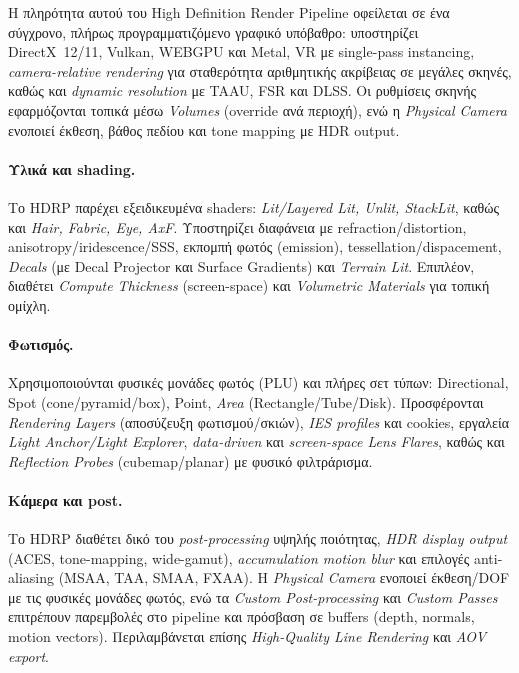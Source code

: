 Η πληρότητα αυτού του High Definition Render Pipeline οφείλεται σε ένα σύγχρονο, πλήρως προγραμματιζόμενο γραφικό υπόβαθρο: υποστηρίζει DirectX~12/11, Vulkan, WEBGPU και Metal, VR με single-pass instancing, \textit{camera-relative rendering} για σταθερότητα αριθμητικής ακρίβειας σε μεγάλες σκηνές, καθώς και \textit{dynamic resolution} με TAAU, FSR και DLSS. Οι ρυθμίσεις σκηνής εφαρμόζονται τοπικά μέσω \textit{Volumes} (override ανά περιοχή), ενώ η \textit{Physical Camera} ενοποιεί έκθεση, βάθος πεδίου και tone mapping με HDR output.

\paragraph{Υλικά και shading.} Το HDRP παρέχει εξειδικευμένα shaders: \textit{Lit/Layered Lit, Unlit, StackLit}, καθώς και \textit{Hair, Fabric, Eye, AxF}. Υποστηρίζει διαφάνεια με refraction/distortion, anisotropy/iridescence/SSS, εκπομπή φωτός (emission), tessellation/dispacement, \textit{Decals} (με Decal Projector και Surface Gradients) και \textit{Terrain Lit}. Επιπλέον, διαθέτει \textit{Compute Thickness} (screen-space) και \textit{Volumetric Materials} για τοπική ομίχλη. 

\paragraph{Φωτισμός.} Χρησιμοποιούνται φυσικές μονάδες φωτός (PLU) και πλήρες σετ τύπων: Directional, Spot (cone/pyramid/box), Point, \textit{Area} (Rectangle/Tube/Disk). Προσφέρονται \textit{Rendering Layers} (αποσύζευξη φωτισμού/σκιών), \textit{IES profiles} και cookies, εργαλεία \textit{Light Anchor/Light Explorer}, \textit{data-driven} και \textit{screen-space Lens Flares}, καθώς και \textit{Reflection Probes} (cubemap/planar) με φυσικό φιλτράρισμα. 

\paragraph{Κάμερα και post.} Το HDRP διαθέτει δικό του \textit{post-processing} υψηλής ποιότητας, \textit{HDR display output} (ACES, tone-mapping, wide-gamut), \textit{accumulation motion blur} και επιλογές anti-aliasing (MSAA, TAA, SMAA, FXAA). Η \textit{Physical Camera} ενοποιεί έκθεση/DOF με τις φυσικές μονάδες φωτός, ενώ τα \textit{Custom Post-processing} και \textit{Custom Passes} επιτρέπουν παρεμβολές στο pipeline και πρόσβαση σε buffers (depth, normals, motion vectors). Περιλαμβάνεται επίσης \textit{High-Quality Line Rendering} και \textit{AOV export}. 

